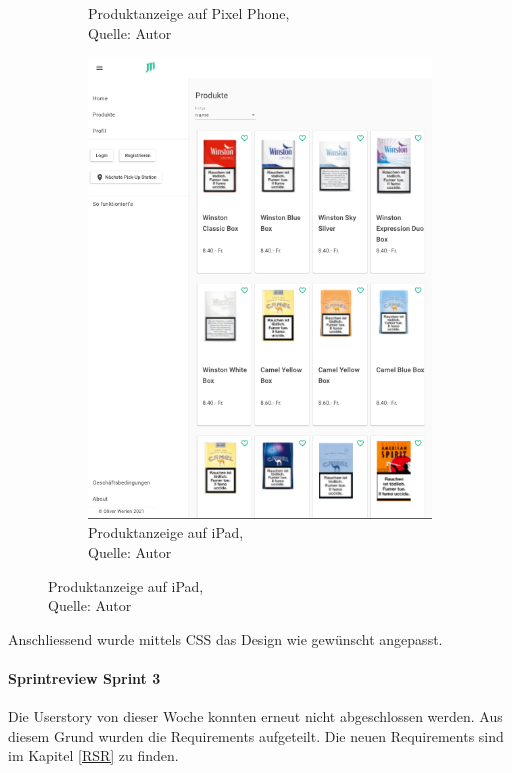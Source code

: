 \begin{figure}[H]
\begin{subfigure}[b]{0.5\textwidth}
		\caption[Produktanzeige auf Pixel Phone]{Produktanzeige auf Pixel Phone,\\ Quelle: Autor}
		\label{img: Prodcuts pixel}
	\end{subfigure}
	\hfill
	\begin{subfigure}[b]{0.5\textwidth}
		\includegraphics[scale=0.5]{images/productsTablet.PNG}
		\caption[Produktanzeige auf iPad]{Produktanzeige auf iPad,\\ Quelle: Autor}
		\label{img: Products iPad}
	\end{subfigure}
\end{figure} 


Anschliessend wurde mittels CSS das Design wie gewünscht angepasst. 

\paragraph{Sprintreview Sprint 3}
Die Userstory von dieser Woche konnten erneut nicht abgeschlossen werden. Aus diesem Grund wurden die Requirements aufgeteilt. Die neuen Requirements sind im Kapitel \ref{RSR} zu finden. 

